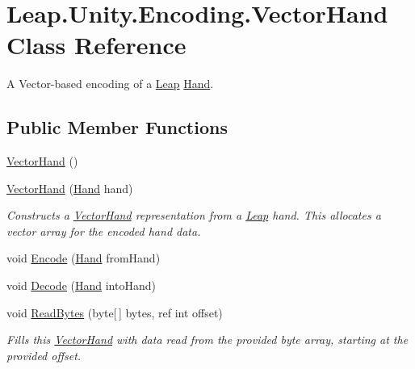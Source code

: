 \hypertarget{class_leap_1_1_unity_1_1_encoding_1_1_vector_hand}{}\section{Leap.\+Unity.\+Encoding.\+Vector\+Hand Class Reference}
\label{class_leap_1_1_unity_1_1_encoding_1_1_vector_hand}


A Vector-\/based encoding of a \mbox{\hyperlink{namespace_leap_1_1_unity_1_1_leap}{Leap}} \mbox{\hyperlink{class_leap_1_1_hand}{Hand}}.  


\subsection*{Public Member Functions}
\begin{DoxyCompactItemize}
\item 
\mbox{\hyperlink{class_leap_1_1_unity_1_1_encoding_1_1_vector_hand_aca6ce4326fca4d753305b08cdf7f4e68}{Vector\+Hand}} ()
\item 
\mbox{\hyperlink{class_leap_1_1_unity_1_1_encoding_1_1_vector_hand_ad68f6c62830b01f9dc778b2bfb6e778a}{Vector\+Hand}} (\mbox{\hyperlink{class_leap_1_1_hand}{Hand}} hand)
\begin{DoxyCompactList}\small\item\em Constructs a \mbox{\hyperlink{class_leap_1_1_unity_1_1_encoding_1_1_vector_hand}{Vector\+Hand}} representation from a \mbox{\hyperlink{namespace_leap_1_1_unity_1_1_leap}{Leap}} hand. This allocates a vector array for the encoded hand data. \end{DoxyCompactList}\item 
void \mbox{\hyperlink{class_leap_1_1_unity_1_1_encoding_1_1_vector_hand_aa949217613221d04f753a3df29c5dd75}{Encode}} (\mbox{\hyperlink{class_leap_1_1_hand}{Hand}} from\+Hand)
\item 
void \mbox{\hyperlink{class_leap_1_1_unity_1_1_encoding_1_1_vector_hand_ae9ced40bf71da643264a1b750bd52e35}{Decode}} (\mbox{\hyperlink{class_leap_1_1_hand}{Hand}} into\+Hand)
\item 
void \mbox{\hyperlink{class_leap_1_1_unity_1_1_encoding_1_1_vector_hand_a06142cb2d22e73457ebfdfdbbe8329d6}{Read\+Bytes}} (byte\mbox{[}$\,$\mbox{]} bytes, ref int offset)
\begin{DoxyCompactList}\small\item\em Fills this \mbox{\hyperlink{class_leap_1_1_unity_1_1_encoding_1_1_vector_hand}{Vector\+Hand}} with data read from the provided byte array, starting at the provided offset. \end{DoxyCompactList}\item 

\end{DoxyCompactItemize}
